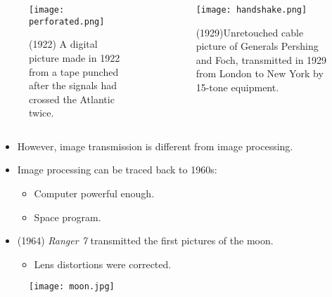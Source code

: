 
\begin{frame}
\begin{columns}
\begin{column}{.48\textwidth}
\begin{figure}
\texttt{[image: perforated.png]}
\caption{(1922) A digital picture made in 1922 from a tape punched after the signals had crossed the Atlantic twice.}
\end{figure}
\end{column}
\begin{column}{.48\textwidth}
\begin{figure}
\texttt{[image: handshake.png]}
\caption{(1929)Unretouched cable picture of Generals Pershing and Foch, transmitted in 1929 from London to New York by 15-tone equipment.}
\end{figure}
\end{column}
\end{columns}
\end{frame}


\begin{frame}
\begin{itemize}
\item However, image transmission is different from image processing.
\item Image processing can be traced back to 1960s:
\begin{itemize}
\item Computer powerful enough.
\item Space program.
\end{itemize}
\end{itemize}
\end{frame}


\begin{frame}
\begin{itemize}
\item (1964) \textit{Ranger 7} transmitted the first pictures of the moon.
\begin{itemize}
\item Lens distortions were corrected.
\end{itemize}
\end{itemize}
\begin{figure}
\texttt{[image: moon.jpg]}
\end{figure}
\end{frame}

